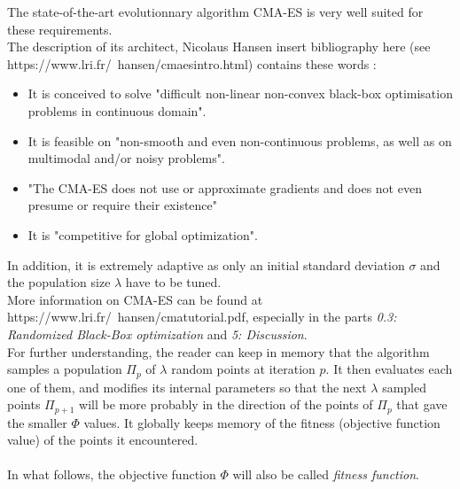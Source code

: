 The state-of-the-art evolutionnary algorithm CMA-ES is very well suited for these requirements.\\
The description of its architect, Nicolaus Hansen \color{blue}insert bibliography here\color{black} (see https://www.lri.fr/~hansen/cmaesintro.html) contains these words :
\begin{itemize}
	\item It is conceived to solve "difficult non-linear non-convex black-box optimisation problems in continuous domain". 
	\item It is feasible on "non-smooth and even non-continuous problems, as well as on multimodal and/or noisy problems".
	\item "The CMA-ES does not use or approximate gradients and does not even presume or require their existence"
	\item It is "competitive for global optimization".
\end{itemize}
In addition, it is extremely adaptive as only an initial standard deviation $\sigma$ and the population size $\lambda$ have to be tuned.\\
More information on CMA-ES can be found at https://www.lri.fr/~hansen/cmatutorial.pdf, especially in the parts \emph{0.3: Randomized Black-Box optimization} and \emph{5: Discussion}.\\
For further understanding, the reader can keep in memory that the algorithm samples a population $\Pi_{p}$ of $\lambda$ random points at iteration $p$. It then evaluates each one of them, and modifies its internal parameters so that the next $\lambda$ sampled points $\Pi_{p+1}$ will be more probably in the direction of the points of $\Pi_{p}$ that gave the smaller $\Phi$ values. It globally keeps memory of the fitness (objective function value) of the points it encountered.\\
\\
In what follows, the objective function $\Phi$ will also be called \emph{fitness function}.
